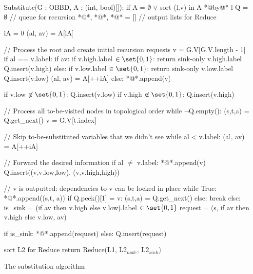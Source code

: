 \begin{lstfloat}
  \centering

  \begin{blstlisting}[language=pseudocode]
  Substitute(G : OBBD, A : (int, bool)[]):
      if A = $\emptyset$ $\lor$
      sort (l,v) in A *@by@* l
      Q = $\emptyset$                  // queue for recursion
      *@\ReduceL@*, *@\ReduceLnode@*, *@\ReduceLsink@* = []  // output lists for Reduce

      iA = 0
      (al, av) = A[iA]

      // Process the root and create initial recursion requests
      v = G.V[G.V.length - 1]
      if al == v.label:
          if av:
              if v.high.label $\in \set{0,1}$: return sink-only v.high.label
              Q.insert(v.high)
          else:
              if v.low.label $\in \set{0,1}$: return sink-only v.low.label
              Q.insert(v.low)
          (al, av) = A[++iA]
      else:
          *@\ReduceL@*.append(v)

          if v.low $\not\in \set{0,1}$: Q.insert(v.low)
          if v.high $\not\in \set{0,1}$: Q.insert(v.high)

      // Process all to-be-visited nodes in topological order
      while $\neg$Q.empty():
          (s,t,a) = Q.get_next()
          v = G.V[t.index]

          // Skip to-be-substituted variables that we didn't see
          while al < v.label: (al, av) = A[++iA]

          // Forward the desired information
          if al $\neq$ v.label:
              *@\ReduceL@*.append(v)
              Q.insert((v,v.low,low), (v,v.high,high))

              // v is outputted: dependencies to v can be locked in place
              while True:
                  *@\ReduceLnode@*.append((s,t, a))
                  if Q.peek()[1] = v: (s,t,a) = Q.get_next()
                  else: break
          else:
              is_sink = (if av then v.high else v.low).label $\in \set{0,1}$
              request = (s, if av then v.high else v.low, av)

              if is_sink: *@\ReduceLsink@*.append(request)
              else: Q.insert(request)

      sort L2 for Reduce
      return Reduce(L1, L2$_{\mathit{node}}$, L2$_{\mathit{sink}}$)
  \end{blstlisting}

  \caption{The substitution algorithm}
  \label{lst:substitute}
\end{lstfloat}

